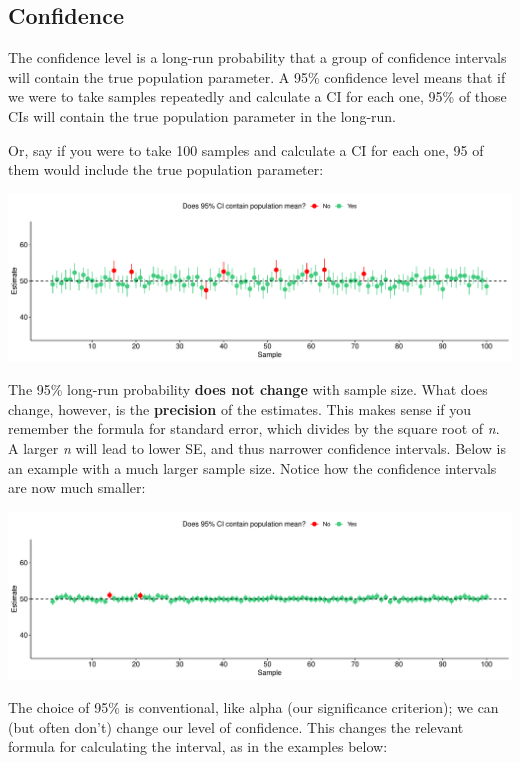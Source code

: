 \documentclass[
]{book}
\begin{document}
\hypertarget{confidence}{%
\subsection{Confidence}\label{confidence}}

The confidence level is a long-run probability that a group of confidence intervals will contain the true population parameter. A 95\% confidence level means that if we were to take samples repeatedly and calculate a CI for each one, 95\% of those CIs will contain the true population parameter in the long-run.

Or, say if you were to take 100 samples and calculate a CI for each one, 95 of them would include the true population parameter:

\includegraphics{_main_files/figure-latex/unnamed-chunk-89-1.pdf}

The 95\% long-run probability \textbf{does not change} with sample size. What does change, however, is the \textbf{precision} of the estimates. This makes sense if you remember the formula for standard error, which divides by the square root of \emph{n}. A larger \emph{n} will lead to lower SE, and thus narrower confidence intervals. Below is an example with a much larger sample size. Notice how the confidence intervals are now much smaller:

\includegraphics{_main_files/figure-latex/unnamed-chunk-90-1.pdf}

The choice of 95\% is conventional, like alpha (our significance criterion); we can (but often don't) change our level of confidence. This changes the relevant formula for calculating the interval, as in the examples below:
\end{document}
